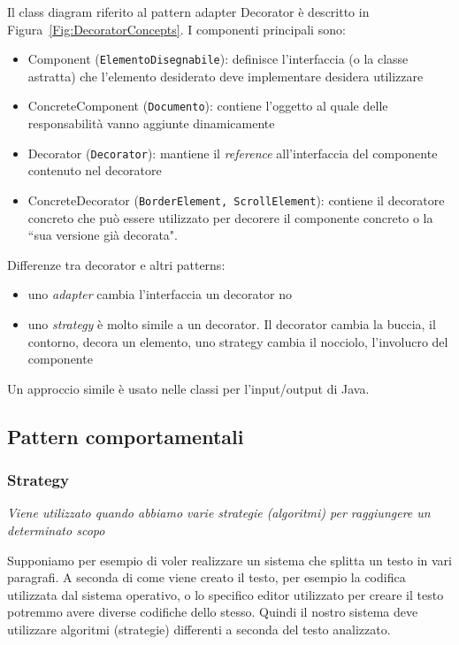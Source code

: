 \documentclass{article}
\begin{document}
\noindent Il class diagram riferito al pattern adapter Decorator \`e descritto in Figura~\ref{Fig:DecoratorConcepts}. I componenti principali sono:
\begin{itemize}
\item Component (\texttt{ElementoDisegnabile}): definisce l'interfaccia (o la classe astratta) che l'elemento desiderato deve implementare desidera utilizzare
\item ConcreteComponent (\texttt{Documento}): contiene l'oggetto al quale delle responsabilit\`a vanno aggiunte dinamicamente
\item Decorator (\texttt{Decorator}): mantiene il \emph{reference} all'interfaccia del componente contenuto nel decoratore
\item ConcreteDecorator (\texttt{BorderElement, ScrollElement}): contiene il decoratore concreto che pu\`o essere utilizzato per decorere il componente concreto o la ``sua versione gi\`a decorata".
\end{itemize}


Differenze tra decorator e altri patterns:
\begin{itemize}
\item uno \emph{adapter} cambia l'interfaccia un decorator no
\item uno \emph{strategy} \`e molto simile a un decorator. Il decorator cambia la buccia, il contorno, decora un elemento, uno strategy cambia il nocciolo, l'involucro del componente
\end{itemize}

Un approccio simile \`e usato nelle classi per l'input/output di Java.


\subsection{Pattern comportamentali}

\subsubsection{Strategy}
\begin{framed}
\emph{Viene utilizzato quando abbiamo varie strategie (algoritmi) per raggiungere un determinato scopo}
\end{framed}

Supponiamo per esempio di voler realizzare un sistema che splitta un testo in vari paragrafi. A seconda di come viene creato il testo, per esempio la codifica utilizzata dal sistema operativo, o lo specifico editor utilizzato per creare il testo potremmo avere diverse codifiche dello stesso. Quindi il nostro sistema deve utilizzare algoritmi (strategie) differenti a seconda del testo analizzato.
\end{document}
